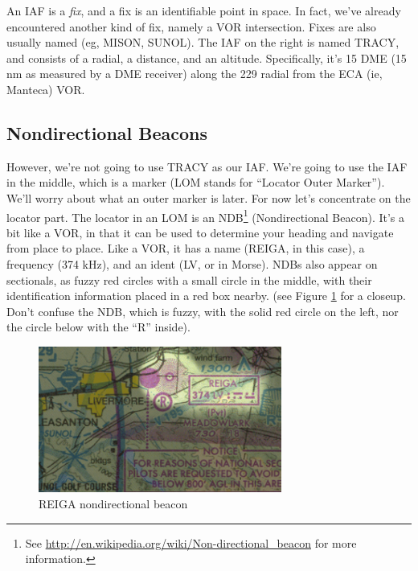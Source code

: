 
An IAF is a \emph{fix}, and a fix is an identifiable point in space.
In fact, we've already encountered another kind of fix, namely a VOR
intersection.  Fixes are also usually named (eg, MISON, SUNOL).  The
IAF on the right is named TRACY, and consists of a radial, a distance,
and an altitude.  Specifically, it's 15 DME (15 nm as measured by a
DME receiver) along the 229 radial from the ECA (ie, Manteca) VOR.



\subsection{Nondirectional Beacons}

However, we're not going to use TRACY as our IAF.  We're going to use
the IAF in the middle, which is a marker (LOM stands for ``Locator
Outer Marker'').  We'll worry about what an outer marker is later.
For now let's concentrate on the locator part.  The locator in an LOM
is an NDB\footnote{See
  \url{http://en.wikipedia.org/wiki/Non-directional_beacon} for more
  information.} (Nondirectional Beacon).  It's a bit like a VOR, in
that it can be used to determine your heading and navigate from place
to place.  Like a VOR, it has a name (REIGA, in this case), a
frequency (374 kHz), and an ident (LV, or
{\mdot\mdash\mdot\mdot\mspace \mdot\mdot\mdot\mdash} in Morse).  NDBs
also appear on sectionals, as fuzzy red circles with a small circle in
the middle, with their identification information placed in a red box
nearby. (see Figure \ref{fig:NDB} for a closeup.  Don't confuse the
NDB, which is fuzzy, with the solid red circle on the left, nor the
circle below with the ``R'' inside).


\begin{figure}
  \begin{center}
    \includegraphics[width=8cm]{img/NDB}
    \caption{REIGA nondirectional beacon}
    \label{fig:NDB}
  \end{center}
\end{figure}

